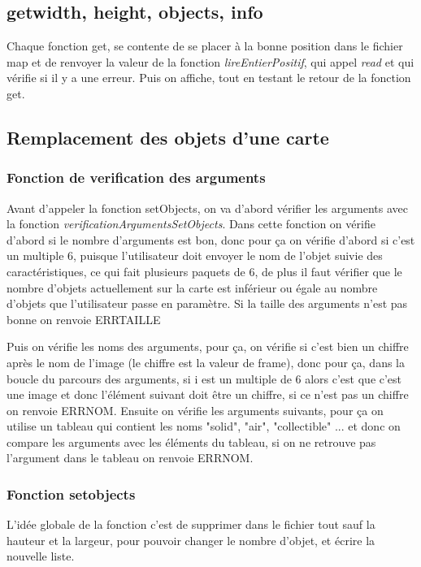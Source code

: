 \documentclass[10pt,a4paper]{article}
\begin{document}
\subsection{getwidth, height, objects, info}
    Chaque fonction get, se contente de se placer à la bonne position dans le fichier map et de renvoyer la valeur de la fonction \textit{lireEntierPositif}, qui appel \textit{read} et qui vérifie si il y a une erreur. Puis on affiche, tout en testant le retour de la fonction get. 
\subsection{Remplacement des objets d'une carte}
        \subsubsection{Fonction de verification des arguments}
            Avant d'appeler la fonction setObjects, on va d'abord vérifier les arguments avec la fonction \textit{verificationArgumentsSetObjects}.
            Dans cette fonction on vérifie d'abord si le nombre d'arguments est bon, donc pour ça on vérifie d'abord si c'est un multiple 6, puisque l'utilisateur doit envoyer le nom de l'objet suivie des caractéristiques, ce qui fait plusieurs paquets de 6, de plus il faut vérifier que le nombre d'objets actuellement sur la carte est inférieur ou égale au nombre d'objets que l'utilisateur passe en paramètre. Si la taille des arguments n'est pas bonne on renvoie ERRTAILLE
            
            Puis on vérifie les noms des arguments, pour ça, on vérifie si c'est bien un chiffre après le nom de l'image (le chiffre est la valeur de frame), donc pour ça, dans la boucle du parcours des arguments, si i est un multiple de 6 alors c'est que c'est une image et donc l'élément suivant doit être un chiffre, si ce n'est pas un chiffre on renvoie ERRNOM.
            Ensuite on vérifie les arguments suivants, pour ça on utilise un tableau qui contient les noms "solid", "air", "collectible" ... et donc on compare les arguments avec les éléments du tableau, si on ne retrouve pas l'argument dans le tableau on renvoie ERRNOM.
            
        \subsubsection{Fonction setobjects}
            L'idée globale de la fonction c'est de supprimer dans le fichier tout sauf la hauteur et la largeur, pour pouvoir changer le nombre d'objet, et écrire la nouvelle liste.
            
\end{document}
